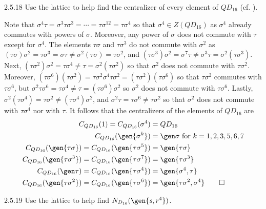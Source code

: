 \begin{exercise}{2.5.18}
    Use the lattice to help find the centralizer of every element of $QD_{16}$ (cf. ).
\end{exercise}

\begin{sol}
    Note that $\sigma^4\tau = \sigma^3\tau\sigma^3 = \cdots = \tau\sigma^{12} = \tau\sigma^4$ so that $\sigma^4 \in Z(QD_{16})$ as $\sigma^4$ already commutes with powers of $\sigma$.
	Moreover, any power of $\sigma$ does not commute with $\tau$ except for $\sigma^4$.
	The elements $\tau\sigma$ and $\tau\sigma^3$ do not commute with $\sigma^2$ as $(\tau\sigma)\sigma^2 = \tau\sigma^3 = \sigma\tau \neq \sigma^2(\tau\sigma) = \tau\sigma^2$, and $(\tau\sigma^3)\sigma^2 = \sigma^7\tau \neq \sigma^3\tau = \sigma^2(\tau\sigma^3)$.
	Next, $(\tau\sigma^2)\sigma^2 = \tau\sigma^4 \neq \tau = \sigma^2(\tau\sigma^2)$ so that $\sigma^2$ does not commute with $\tau\sigma^2$.
	Moreover, $(\tau\sigma^6)(\tau\sigma^2) = \tau\sigma^2\sigma^4\tau\sigma^2 = (\tau\sigma^2)(\tau\sigma^6)$ so that $\tau\sigma^2$ commutes with $\tau\sigma^6$, but $\sigma^2\tau\sigma^6 = \tau\sigma^4 \neq \tau = (\tau\sigma^6)\sigma^2$ so $\sigma^2$ does not commute with $\tau\sigma^6$.
	Lastly, $\sigma^2(\tau\sigma^4) = \tau\sigma^2 \neq (\tau\sigma^4)\sigma^2$, and $\sigma^2\tau = \tau\sigma^6 \neq \tau\sigma^2$ so that $\sigma^2$ does not commute with $\tau\sigma^4$ nor with $\tau$.
	It follows that the centralizers of the elements of $QD_{16}$ are
    \begin{align*}
        C_{QD_{16}}(1) = C_{QD_{16}}(\sigma^4) & = QD_{16} \\
        C_{QD_{16}}(\gen{\sigma^k}) & = \gen\sigma \text{ for $k = 1, 2, 3, 5, 6, 7$} \\
        C_{QD_{16}}(\gen{\tau\sigma}) = C_{QD_{16}}(\gen{\tau\sigma^5}) & = \gen{\tau\sigma} \\
        C_{QD_{16}}(\gen{\tau\sigma^3}) = C_{QD_{16}}(\gen{\tau\sigma^7}) & = \gen{\tau\sigma^3} \\
        C_{QD_{16}}(\gen\tau) = C_{QD_{16}}(\gen{\tau\sigma^4}) & = \gen{\sigma^4, \tau} \\
        C_{QD_{16}}(\gen{\tau\sigma^2}) = C_{QD_{16}}(\gen{\tau\sigma^6}) & = \gen{\tau\sigma^2, \sigma^4} \qedhere
    \end{align*}
\end{sol}

\begin{exercise}{2.5.19}
    Use the lattice to help find $N_{D_{16}}(\gen{s, r^4})$.
\end{exercise}

